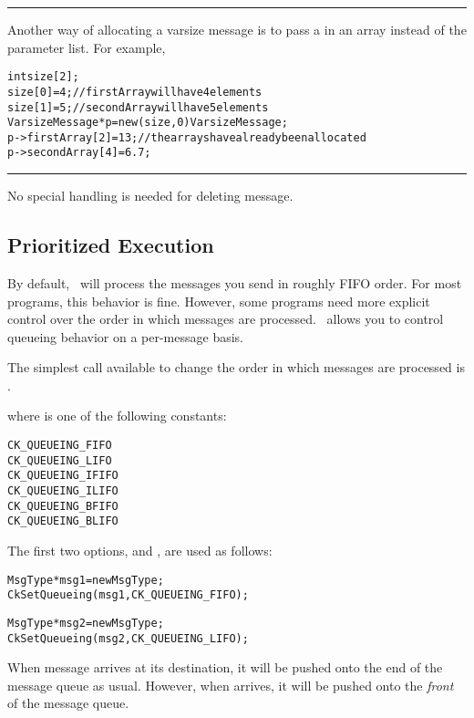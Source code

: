 \tiny
\hrule
Another way of allocating a varsize message is to pass a  in an array
instead of the parameter list. For example,
\begin{alltt}
int size[2];
size[0] = 4;               // firstArray will have 4 elements
size[1] = 5;               // secondArray will have 5 elements 
VarsizeMessage* p = new(size, 0) VarsizeMessage;
p->firstArray[2] = 13;     // the arrays have already been allocated 
p->secondArray[4] = 6.7; 
\end{alltt}
\hrule
\normalsize

No special handling is needed for deleting  message.

\subsection{Prioritized Execution}
\label{prioritized message passing}

By default, \charmpp\ will process the messages you send in roughly
FIFO order.  For most programs, this
behavior is fine.  However, some programs need more explicit control
over the order in which messages are processed.  \charmpp\ allows you
to control queueing behavior on a per-message basis.

The simplest call available to change the order in which messages
are processed is .


where  is one of the following constants:

\begin{alltt}
  CK_QUEUEING_FIFO
  CK_QUEUEING_LIFO
  CK_QUEUEING_IFIFO
  CK_QUEUEING_ILIFO
  CK_QUEUEING_BFIFO
  CK_QUEUEING_BLIFO
\end{alltt}

The first two options,   and
, are used as follows: 

\begin{alltt}
  MsgType *msg1 = new MsgType ;
  CkSetQueueing(msg1, CK_QUEUEING_FIFO);

  MsgType *msg2 = new MsgType ;
  CkSetQueueing(msg2, CK_QUEUEING_LIFO);
\end{alltt}

When message  arrives at its destination, it will be pushed onto the
end of the message queue as usual.  However, when  arrives, it will be
pushed onto the {\em front} of the message queue.

